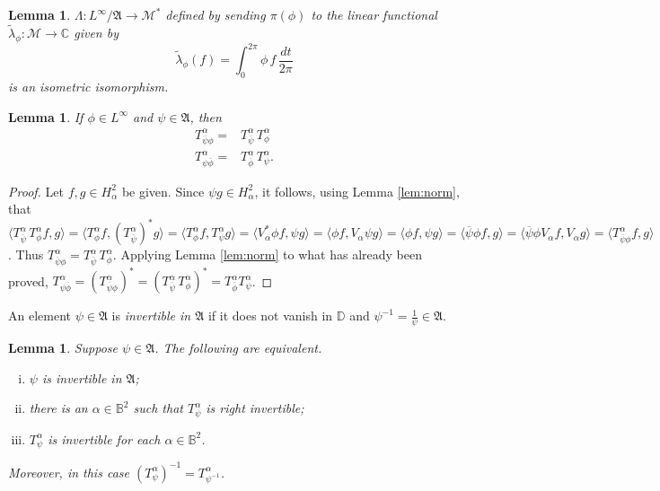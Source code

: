 \documentclass[12pt]{amsart}
\newtheorem{lemma}[theorem]{Lemma}
\theoremstyle{definition}
\theoremstyle{remark}
\numberwithin{equation}{section}
\begin{document}
\begin{lemma}
\label{lem:dual}
 $\Lambda:L^\infty /{\mathfrak{A}}\to \mathscr{M}^*$ defined by sending $\pi(\phi)$ to the linear functional $\tilde{\lambda}_\phi:\mathscr{M}\to {\mathbb C}$ given by
\[
 \tilde{\lambda}_\phi(f) = {\int_{0}^{2\pi}} \phi \, f \, {\frac{dt}{2\pi}}
\]
 is an isometric isomorphism.
\end{lemma}

\begin{lemma}
\label{lem:product}
 If $\phi\in L^\infty$ and $\psi\in {\mathfrak{A}}$, then 
\[
\begin{split}
 T^\alpha_{\overline{\psi}\phi}=& T^\alpha_{\overline{\psi}}\, T^\alpha_\phi\\
 T^\alpha_{\psi\overline{\phi}} = & T^\alpha_{\overline{\phi}} \,  T^\alpha_\psi.
\end{split}
\]
\end{lemma}

\begin{proof}
Let $f, g \in H^2_\alpha$ be given. Since $\psi g \in H^2_{\alpha}$, it follows, using Lemma \ref{lem:norm},  that $\langle T^\alpha_{\overline{\psi}}\, T^\alpha_\phi f, g \rangle = 
\langle T^\alpha_\phi f, (T^\alpha_{\overline{\psi}})^*g \rangle = \langle T^\alpha_\phi f, T^\alpha_{{\psi}}g \rangle 
= \langle V_{\alpha}^* \phi f, \psi g \rangle = \langle \phi f, V_{\alpha} \psi g \rangle = 
\langle \phi f, \psi g \rangle = \langle \overline{\psi} \phi f, g \rangle = \langle \overline{\psi} \phi V_{\alpha}f, V_{\alpha} g \rangle = \langle T_{\overline{\psi}\phi}^{\alpha} f, g \rangle$. Thus $T^\alpha_{\overline{\psi}\phi}= T^\alpha_{\overline{\psi}}\, T^\alpha_\phi$. Applying Lemma \ref{lem:norm} to what has already been proved, $T^\alpha_{\psi\overline{\phi}} = (T^\alpha_{\overline{\psi}\phi})^* = (T^\alpha_{\overline{\psi}}\, T^\alpha_\phi)^* = T^\alpha_{\overline{\phi}} T^\alpha_{\psi}$.
\end{proof}

An element $\psi\in {\mathfrak{A}}$ is {{\it{{invertible in ${\mathfrak{A}}$}}}{}} if it does not  vanish in ${\mathbb D}$ and $\psi^{-1}=\frac{1}{\psi}\in {\mathfrak{A}}$. 

\begin{lemma}
\label{lem:inverse}
Suppose $\psi\in {\mathfrak{A}}$. The following are equivalent.
\begin{enumerate}[(i)]
 \item \label{it:invertible} $\psi$ is invertible in ${\mathfrak{A}}$;
 \item \label{it:somea} there is an $\alpha\in {\mathbb{B}^2}$ such that $T^\alpha_\psi$ is right invertible;
 \item \label{it:alla}$T^\alpha_\psi$ is invertible for each $\alpha \in {\mathbb{B}^2}$.
\end{enumerate}
Moreover, in this case  $(T^\alpha_\psi)^{-1} = T^\alpha_{\psi^{-1}}$.
\end{lemma}
\end{document}
